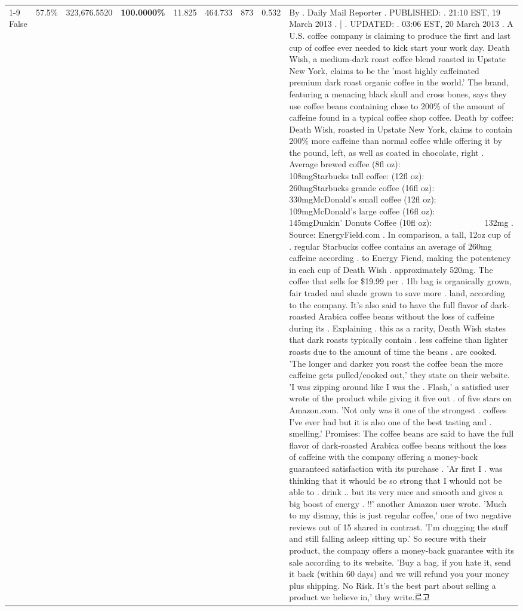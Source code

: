 \begin{table}[H]
{\begin{tabular}{lllrlllll}
\cline{1-9}
False & 57.5\% & 323,676.5520 & \bfseries \color{red} 100.0000\% & 11.825 & 464.733 & 873 & 0.532 & By . Daily Mail Reporter . PUBLISHED: . 21:10 EST, 19 March 2013 . | . UPDATED: . 03:06 EST, 20 March 2013 . A U.S. coffee company is claiming to produce the first and last cup of coffee ever needed to kick start your work day. Death Wish, a medium-dark roast coffee blend roasted in Upstate New York, claims to be the 'most highly caffeinated premium dark roast organic coffee in the world.' The brand, featuring a menacing black skull and cross bones, says they use coffee beans containing close to 200\% of the amount of caffeine found in a typical coffee shop coffee. Death by coffee: Death Wish, roasted in Upstate New York, claims to contain 200\% more caffeine than normal coffee while offering it by the pound, left, as well as coated in chocolate, right . Average brewed coffee (8fl oz):              108mgStarbucks tall coffee: (12fl oz):                260mgStarbucks grande coffee (16fl oz):         330mgMcDonald's small coffee (12fl oz):           109mgMcDonald's large coffee (16fl oz):           145mgDunkin' Donuts Coffee (10fl oz):             132mg . Source: EnergyField.com . In comparison, a tall, 12oz cup of . regular Starbucks coffee contains an average of 260mg caffeine according . to Energy Fiend, making the potentency in each cup of Death Wish . approximately 520mg. The coffee that sells for \$19.99 per . 1lb bag is organically grown, fair traded and shade grown to save more . land, according to the company. It's also said to have the full flavor of dark-roasted Arabica coffee beans without the loss of caffeine during its . Explaining . this as a rarity, Death Wish states that dark roasts typically contain . less caffeine than lighter roasts due to the amount of time the beans . are cooked. 'The longer and darker you roast the coffee bean the more caffeine gets pulled/cooked out,' they state on their website. 'I was zipping around like I was the . Flash,' a satisfied user wrote of the product while giving it five out . of five stars on Amazon.com. 'Not only was it one of the strongest . coffees I've ever had but it is also one of the best tasting and . smelling.’ Promises: The coffee beans are said to have the full flavor of dark-roasted Arabica coffee beans without the loss of caffeine with the company offering a money-back guaranteed satisfaction with its purchase . 'Ar first I . was thinking that it whould be so strong that I whould not be able to . drink .. but its very nuce and smooth and gives a big boost of energy . !!' another Amazon user wrote. 'Much to my dismay, this is just regular coffee,' one of two negative reviews out of 15 shared in contrast. 'I'm chugging the stuff and still falling asleep sitting up.' So secure with their product, the company offers a money-back guarantee with its sale according to its website. 'Buy a bag, if you hate it, send it back (within 60 days) and we will refund you your money plus shipping. No Risk. It’s the best part about selling a product we believe in,' they write.르고 \\

\end{tabular}}
\end{table}
